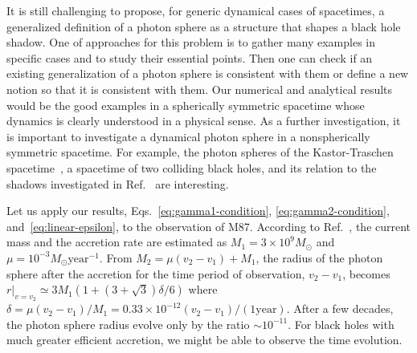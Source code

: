 \documentclass[prd,showpacs,preprintnumbers,groupedaddress,superscriptaddress,nofootinbib,11pt]{revtex4-1} %
\theoremstyle{newplain}
\newcommand{\mr}[1]{\mathrm{#1}}
\begin{document}
\par
It is still challenging to propose, for generic dynamical cases of spacetimes, a generalized definition of a photon sphere as a structure that shapes a black hole shadow.
One of approaches for this problem is to gather many examples in specific cases and to study their essential points.
Then one can check if an existing generalization of a photon sphere is consistent with them or define a new notion so that it is consistent with them.
Our numerical and analytical results would be the good examples in a spherically symmetric spacetime whose dynamics is clearly understood in a physical sense.
As a further investigation, it is important to investigate a dynamical photon sphere in a nonspherically symmetric spacetime.
For example, the photon spheres of the Kastor-Traschen spacetime~\cite{Kastor:1992nn}, a spacetime of two colliding black holes, and its relation to the shadows investigated in Ref.~\cite{Okabayashi_2020, Yumoto:2012kz} are interesting.
\par
Let us apply our results, Eqs.~\eqref{eq:gamma1-condition}, \eqref{eq:gamma2-condition}, and~\eqref{eq:linear-epsilon}, to the observation of M87.
According to Ref.~\cite{Kuo_2014}, the current mass and the accretion rate are estimated as $M_1=3\times 10^9 M_{\odot}$ and $\mu=10^{-3}M_{\odot} \mr{year}^{-1}$.
From $M_2=\mu (v_2-v_1)+M_1$, the radius of the photon sphere after the accretion for the time period of observation, $v_2-v_1$, becomes $r|_{v=v_2}
\simeq 3M_1(1+(3+\sqrt{3})\delta/6)$ where $\delta=\mu(v_2-v_1)/M_1=0.33\times10^{-12}(v_2-v_1)/(1\mr{year})$.
After a few decades, the photon sphere radius evolve only by the ratio $\sim 10^{-11}$.
For black holes with much greater efficient accretion, we might be able to observe the time evolution.




%
\end{document}
